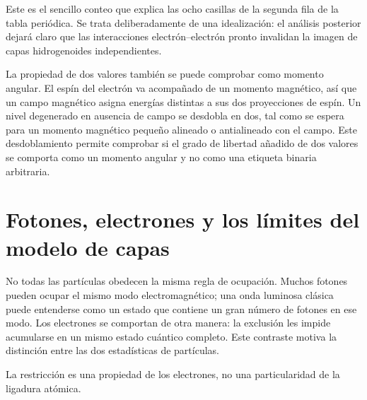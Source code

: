 Este es el sencillo conteo que explica las ocho casillas de la segunda fila de la tabla periódica. Se trata deliberadamente de una idealización: el análisis posterior dejará claro que las interacciones electrón--electrón pronto invalidan la imagen de capas hidrogenoides independientes.

La propiedad de dos valores también se puede comprobar como momento angular. El espín del electrón va acompañado de un momento magnético, así que un campo magnético asigna energías distintas a sus dos proyecciones de espín. Un nivel degenerado en ausencia de campo se desdobla en dos, tal como se espera para un momento magnético pequeño alineado o antialineado con el campo. Este desdoblamiento permite comprobar si el grado de libertad añadido de dos valores se comporta como un momento angular y no como una etiqueta binaria arbitraria.

\section{Fotones, electrones y los límites del modelo de capas}

No todas las partículas obedecen la misma regla de ocupación. Muchos fotones pueden ocupar el mismo modo electromagnético; una onda luminosa clásica puede entenderse como un estado que contiene un gran número de fotones en ese modo. Los electrones se comportan de otra manera: la exclusión les impide acumularse en un mismo estado cuántico completo. Este contraste motiva la distinción entre las dos estadísticas de partículas.

\begin{classroomqa}
\end{classroomqa}

La restricción es una propiedad de los electrones, no una particularidad de la ligadura atómica.

\begin{classroomqa}
\end{classroomqa}

